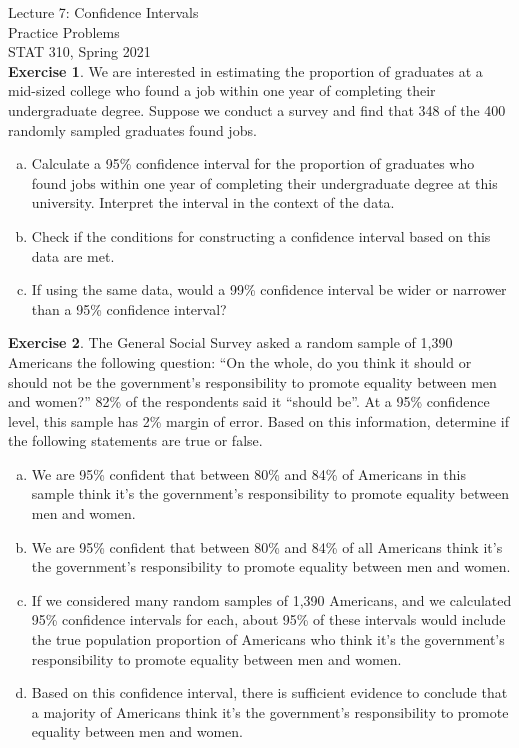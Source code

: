 \documentclass[12pt]{article}\usepackage[]{graphicx}\usepackage[]{color}
\begin{document}
\setlength\parindent{0pt}

Lecture 7: Confidence Intervals\\
Practice Problems\\
STAT 310, Spring 2021\\

\textbf{Exercise 1}.  We are interested in estimating the proportion of graduates at a mid-sized college who found a job within one year of completing their undergraduate degree.  Suppose we conduct a survey and find that 348 of the 400 randomly sampled graduates found jobs.
\begin{enumerate}[(a)]
\item Calculate a 95\% confidence interval for the proportion of graduates who found jobs within one year of completing their undergraduate degree at this university.  Interpret the interval in the context of the data.\\ 
\vspace{6cm}
\item Check if the conditions for constructing a confidence interval based on this data are met.
\vspace{3cm}
\item If using the same data, would a 99\% confidence interval be wider or narrower than a 95\% confidence interval?\\
\end{enumerate}

\newpage

\textbf{Exercise 2}.  The General Social Survey asked a random sample of 1,390 Americans the following question: ``On the whole, do you think it should or should not be the government's responsibility to promote equality between men and women?'' 82\% of the respondents said it ``should be''.  At a 95\% confidence level, this sample has 2\% margin of error.  Based on this information, determine if the following statements are true or false.
\begin{enumerate}[(a)]
\item We are 95\% confident that between 80\% and 84\% of Americans in this sample think it's the government's responsibility to promote equality between men and women.\\
\item We are 95\% confident that between 80\% and 84\% of all Americans think it's the government's responsibility to promote equality between men and women.\\
\item If we considered many random samples of 1,390 Americans, and we calculated 95\% confidence intervals for each, about 95\% of these intervals would include the true population proportion of Americans who think it's the government's responsibility to promote equality between men and women.\\
\item Based on this confidence interval, there is sufficient evidence to conclude that a majority of Americans think it's the government's responsibility to promote equality between men and women.
\end{enumerate}
\end{document}
